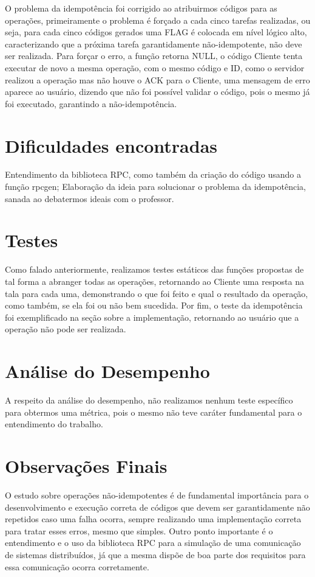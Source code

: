 \documentclass{article}
\begin{document}
\begin{multicols*}{2}
\newline
O problema da idempotência foi corrigido ao atribuirmos códigos para as operações, primeiramente o problema é forçado a cada cinco tarefas realizadas, ou seja, para cada cinco códigos gerados uma FLAG é colocada em nível lógico alto, caracterizando que a próxima tarefa garantidamente não-idempotente, não deve ser realizada. Para forçar o erro, a função retorna NULL, o código Cliente tenta executar de novo a mesma operação, com o mesmo código e ID, como o servidor realizou a operação mas não houve o ACK para o Cliente, uma mensagem de erro aparece ao usuário, dizendo que não foi possível validar o código, pois o mesmo já foi executado, garantindo a não-idempotência.

\section{Dificuldades encontradas}
Entendimento da biblioteca RPC, como também da criação do código usando a função rpcgen; Elaboração da ideia para solucionar o problema da idempotência, sanada ao debatermos ideais com o professor.

\section{Testes}
Como falado anteriormente, realizamos testes estáticos das funções propostas de tal forma a abranger todas as operações, retornando ao Cliente uma resposta na tala para cada uma, demonstrando o que foi feito e qual o resultado da operação, como também, se ela foi ou não bem sucedida. Por fim, o teste da idempotência foi exemplificado na seção sobre a implementação, retornando ao usuário que a operação não pode ser realizada.

\section{Análise do Desempenho}
A respeito da análise do desempenho, não realizamos nenhum teste específico para obtermos uma métrica, pois o mesmo não teve caráter fundamental para o entendimento do trabalho.

\section{Observações Finais}
O estudo sobre operações não-idempotentes é de fundamental importância para o desenvolvimento e execução correta de códigos que devem ser garantidamente não repetidos caso uma falha ocorra, sempre realizando uma implementação correta para tratar esses erros, mesmo que simples. Outro ponto importante é o entendimento e o uso da biblioteca RPC para a simulação de uma comunicação de sistemas distribuídos, já que a mesma dispõe de boa parte dos requisitos para essa comunicação ocorra corretamente. 

\end{multicols*}
\end{document}
